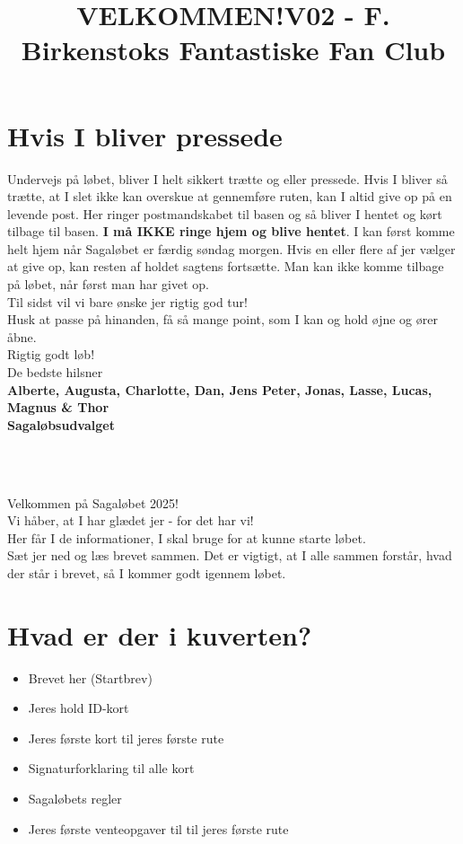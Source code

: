 \section{Hvis I bliver pressede}
Undervejs på løbet, bliver I helt sikkert trætte og eller pressede. Hvis I bliver så trætte, at I slet ikke kan overskue at gennemføre ruten, kan I altid give op på en levende post. Her ringer postmandskabet til basen og så bliver I hentet og kørt tilbage til basen. \textbf{I må IKKE ringe hjem og blive hentet}. I kan først komme helt hjem når Sagaløbet er færdig søndag morgen. Hvis en eller flere af jer vælger at give op, kan resten af holdet sagtens fortsætte. Man kan ikke komme tilbage på løbet, når først man har givet op.\\
\newline
Til sidst vil vi bare ønske jer rigtig god tur!\\
Husk at passe på hinanden, få så mange point, som I kan og hold øjne og ører åbne.\\
\newline
Rigtig godt løb!\\
\newline
\textcolor{søblå}{De bedste hilsner}\\
\textcolor{natblå}{\textbf{Alberte, Augusta, Charlotte, Dan, Jens Peter, Jonas, Lasse, Lucas, Magnus \& Thor}}\\
\textcolor{natblå}{\textbf{Sagaløbsudvalget}}\\
\newpage
\title{VELKOMMEN!}\\
\newline
\title{\textcolor{søblå}{V02 - F. Birkenstoks Fantastiske Fan Club }}\\
\newline
Velkommen på Sagaløbet 2025!\\
Vi håber, at I har glædet jer - for det har vi!\\
Her får I de informationer, I skal bruge for at kunne starte løbet.\\
Sæt jer ned og læs brevet sammen. Det er vigtigt, at I alle sammen forstår, hvad der står i brevet, så I kommer godt igennem løbet.
\section{Hvad er der i kuverten?}
\begin{itemize}
    \item Brevet her (Startbrev)
    \item Jeres hold ID-kort
    \item Jeres første kort til jeres første rute
    \item Signaturforklaring til alle kort
    \item Sagaløbets regler
    \item Jeres første venteopgaver til til jeres første rute
\end{itemize}
